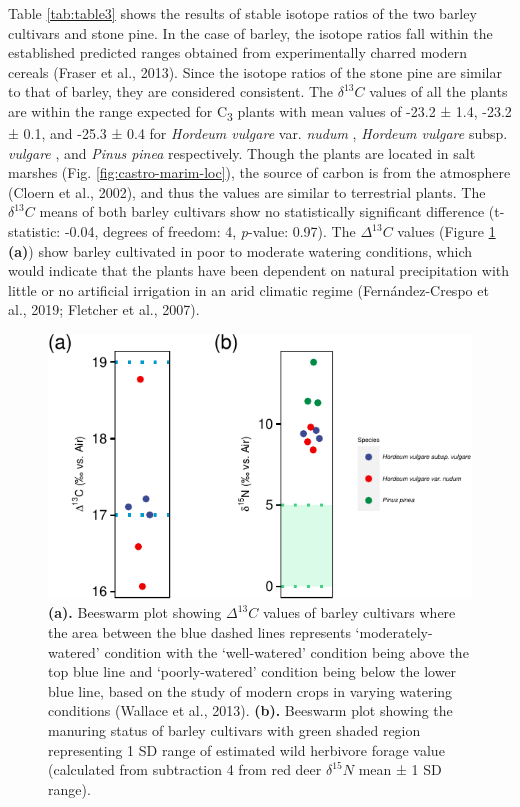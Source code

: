 \documentclass[review]{elsarticle} %
\begin{document}
Table \ref{tab:table3} shows the results of stable isotope ratios of the two barley cultivars and stone pine. In the case of barley, the isotope ratios fall within the established predicted ranges obtained from experimentally charred modern cereals (Fraser et al., 2013). Since the isotope ratios of the stone pine are similar to that of barley, they are considered consistent. The \(\delta ^{13}C\) values of all the plants are within the range expected for C\textsubscript{3} plants with mean values of -23.2 ± 1.4\text{\textperthousand}, -23.2 ± 0.1\text{\textperthousand}, and -25.3 ± 0.4\text{\textperthousand} for \emph{Hordeum vulgare} var. \emph{nudum} , \emph{Hordeum vulgare} subsp. \emph{vulgare} , and \emph{Pinus pinea} respectively. Though the plants are located in salt marshes (Fig. \ref{fig:castro-marim-loc}), the source of carbon is from the atmosphere (Cloern et al., 2002), and thus the values are similar to terrestrial plants. The \(\delta ^{13}C\) means of both barley cultivars show no statistically significant difference (t-statistic: -0.04, degrees of freedom: 4, \emph{p}-value: 0.97). The \(\Delta ^{13}C\) values (Figure \ref{fig:iso-hord-plots} \textbf{(a)}) show barley cultivated in poor to moderate watering conditions, which would indicate that the plants have been dependent on natural precipitation with little or no artificial irrigation in an arid climatic regime (Fernández-Crespo et al., 2019; Fletcher et al., 2007).



\begin{figure}
\centering
\includegraphics{castro_main_body_files/figure-latex/iso-hord-plots-1.pdf}
\caption{\label{fig:iso-hord-plots}\textbf{(a).} Beeswarm plot showing \(\Delta ^{13}C\) values of barley cultivars where the area between the blue dashed lines represents `moderately-watered' condition with the `well-watered' condition being above the top blue line and `poorly-watered' condition being below the lower blue line, based on the study of modern crops in varying watering conditions (Wallace et al., 2013). \textbf{(b).} Beeswarm plot showing the manuring status of barley cultivars with green shaded region representing 1 SD range of estimated wild herbivore forage value (calculated from subtraction 4 \text{\textperthousand} from red deer \(\delta ^{15}N\) mean ± 1 SD range).}
\end{figure}
\end{document}
